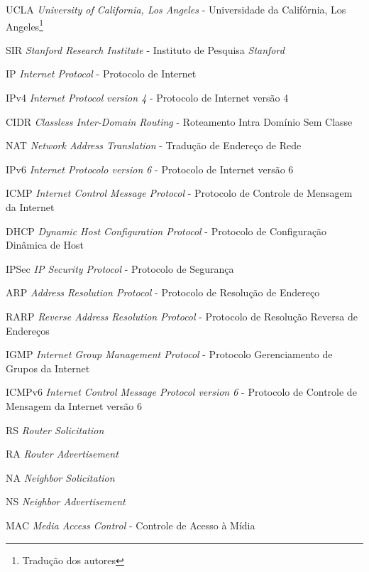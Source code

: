 
\begin{siglas}
	
	\item[UCLA]     \textit{University of California, Los Angeles} - Universidade da Califórnia, Los Angeles\footnote{Tradução dos autores}
	\item[SIR]      \textit{Stanford Research Institute} - Instituto de Pesquisa \textit{Stanford}\footnotemark[1]
	\item[IP]       \textit{Internet Protocol} - Protocolo de Internet\footnotemark[1]
	\item[IPv4]     \textit{Internet Protocol version 4} - Protocolo de Internet versão 4\footnotemark[1]
	\item[CIDR]     \textit{Classless Inter-Domain Routing} - Roteamento Intra Domínio Sem Classe\footnotemark[1]
	\item[NAT]      \textit{Network Address Translation} - Tradução de Endereço de Rede\footnotemark[1]
	\item[IPv6]     \textit{Internet Protocolo version 6} - Protocolo de Internet versão 6\footnotemark[1]
	\item[ICMP]     \textit{Internet Control Message Protocol} - Protocolo de Controle de Mensagem da Internet\footnotemark[1]
	\item[DHCP]     \textit{Dynamic Host Configuration Protocol} - Protocolo de Configuração Dinâmica de Host\footnotemark[1]
	\item[IPSec]    \textit{IP Security Protocol} - Protocolo de Segurança\footnotemark[1]
	\item[ARP]      \textit{Address Resolution Protocol} - Protocolo de Resolução de Endereço\footnotemark[1]
	\item[RARP]     \textit{Reverse Address Resolution Protocol} - Protocolo de Resolução Reversa de Endereços\footnotemark[1]
	\item[IGMP]     \textit{Internet Group Management Protocol} - Protocolo Gerenciamento de Grupos da Internet\footnotemark[1]
	\item[ICMPv6]   \textit{Internet Control Message Protocol version 6} - Protocolo de Controle de Mensagem da Internet versão 6\footnotemark[1]
	\item[RS]       \textit{Router Solicitation}
	\item[RA]       \textit{Router Advertisement}
	\item[NA]       \textit{Neighbor Solicitation}
	\item[NS]       \textit{Neighbor Advertisement}
	\item[MAC]      \textit{Media Access Control} - Controle de Acesso à Mídia\footnotemark[1]

\end{siglas}
